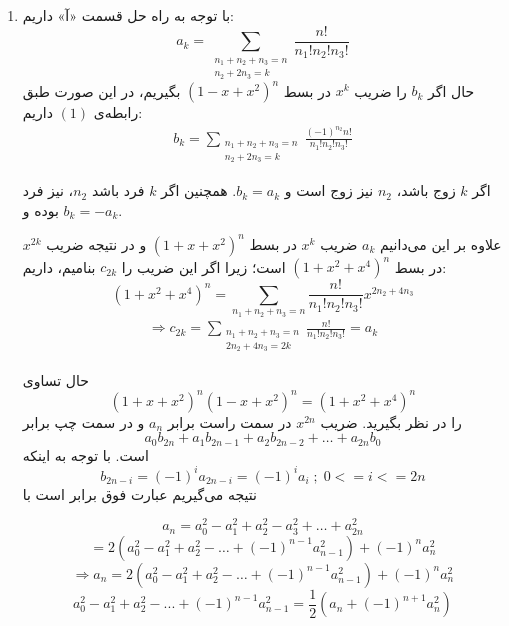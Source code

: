 \begin{enumerate}
	\item
        \p
    	با توجه به راه حل قسمت 
        «آ»
        داریم:
        \[
            a_k = \sum_{\substack{n_1 + n_2 + n_3 = n \\ n_2 + 2n_3 = k}} \frac{n!}{n_1!n_2!n_3!}
        \]
    	حال اگر 
        $b_k$
        را ضریب 
        $x^k$
         در بسط 
         $(1 - x + x^2)^n$
        بگیریم، در این صورت 
        طبق رابطه‌ی 
        $(1)$
        داریم:
        \begin{align*}
            b_k = \sum_{\substack{n_1 + n_2 + n_3 =  n\\  n_2 + 2n_3 = k}} \frac{(-1)^{n_2}n!}{n_1!n_2!n_3!}
        \end{align*}

    	اگر 
         $k$
        زوج باشد،
        $n_2$
        نیز زوج است و 
        $b_k = a_k$.
        همچنین اگر 
        $k$
        فرد باشد
        $n_2$، 
        نیز فرد بوده و $b_k = -a_k$.
    	 
        \p
        علاوه بر این می‌دانیم 
        $a_k$
        ضریب 
        $x^k$
        در بسط 
        $(1 + x + x^2)^n$
        و در نتیجه ضریب 
        $x^{2k}$
        در بسط 
        $(1 + x^2 + x^4)^n$
        است؛ زیرا اگر این ضریب را
        $c_{2k}$
        بنامیم، داریم: 
        $$(1+x^2+x^4)^n=\sum_{n_1+n_2+n_3=n} \frac{n!}{n_1!n_2!n_3!} x^{2n_2+4n_3}$$
        \begin{align*}
            \Rightarrow c_{2k} = \sum_{\substack{n_1+n_2+n_3=n\\  2n_2 + 4n_3 = 2k}} \frac{n!}{n_1!n_2!n_3!} = a_{k}
        \end{align*}
        
         \p
         حال تساوی
        $$(1 + x + x^2)^n(1 - x + x^2)^n = (1 + x^2 + x^4)^n$$
        را در نظر بگیرید. ضریب
        $x^{2n}$
         در سمت راست برابر 
         $a_n$
          و در سمت چپ برابر
        $$a_0b_{2n} + a_1b_{2n - 1} + a_2b_{2n - 2} + \dots + a_{2n}b_0$$
        است. با توجه به اینکه
        $$b_{2n-i} = (-1)^i a_{2n-i} = (-1)^i a_{i} \; ; \; 0 <= i <= 2n$$
        نتیجه می‌گیریم عبارت فوق برابر است با
        
        $$a_n = a_0^2 - a_1^2 + a_2^2 - a_3^2 + \dots + a_{2n}^2 $$
        $$= 2(a_0^2 - a_1^2 + a_2^2 - \dots + (-1)^{n - 1}a_{n - 1}^2) + (-1)^n a_n^2$$
        $$\Rightarrow a_n = 2(a_0^2 - a_1^2 + a_2^2 - \dots + (-1)^{n - 1}a_{n - 1}^2) + (-1)^n a_n^2 $$
        $$a_0^2 - a_1^2 + a_2^2 - ... + (-1)^{n - 1}a_{n - 1}^2 = \frac{1}{2}(a_n + (-1)^{n + 1}a_n^2)$$
        
	\end{enumerate}
